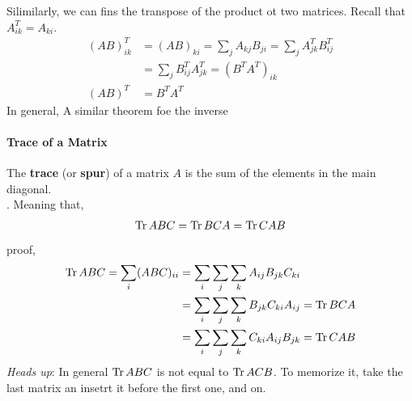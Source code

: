             Silimilarly, we can fins the transpose of the product ot two matrices. Recall that $A_{ik}^T = A_{ki}$.
            \begin{align*}
                (AB)_{ik}^T &= (AB)_{ki} = \sum_j A_{kj} B_{ji} = \sum_j A_{jk}^T B_{ij}^T \\
                            &=\sum_j B_{ij}^T A_{jk}^T = (B^T A^T)_{ik} \\
                    (AB)^T &= B^T A^T
            \end{align*}
            In general, 
            A similar theorem foe the inverse

            \paragraph{Trace of a Matrix} %
            \label{par:Trace of a Matrix}
            The \textbf{trace} (or \textbf{spur}) of a matrix $A$ is the sum of the elements in the main diagonal.\\
            . Meaning that,
            \begin{align*}
                \operatorname{Tr}{ABC} = \operatorname{Tr}{BCA} = \operatorname{Tr}{CAB}
            \end{align*}
            proof,
            \begin{align*}
                \operatorname{Tr}{ABC} = \sum_i (ABC)_{ii} &= \sum_i \sum_j \sum_k A_{ij} B_{jk} C_{ki} \\
                                            &= \sum_i \sum_j \sum_k B_{jk} C_{ki} A_{ij} = \operatorname{Tr}{BCA} \\
                                            &= \sum_i \sum_j \sum_k C_{ki} A_{ij} B_{jk} = \operatorname{Tr}{CAB}
            \end{align*}
            \textit{Heads up}: In general $\operatorname{Tr}{ABC}$ is not equal to $\operatorname{Tr}{ACB}$. To memorize it, take the last matrix an insetrt it before the first one, and on.
